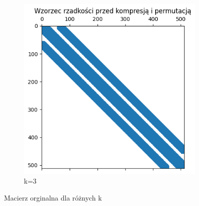 \documentclass{article}
\begin{document}
\begin{figure}[htbp]
\begin{subfigure}[b]{0.4\textwidth}
      \includegraphics[width=\linewidth]{img/2ak3.png}
      \caption{k=3}
      \label{fig:obraz2}
  \end{subfigure}
  \caption{Macierz orginalna dla różnych k}
  \label{fig:zestaw_obrazkow}
\end{figure}
\end{document}
